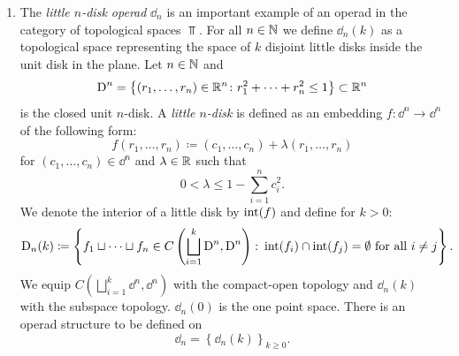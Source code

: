 \begin{egs}
\begin{enumerate}
            \item The {\em little $n$-disk operad} $\dd_n$ is an important
            example of an operad in the category of topological spaces $\Top$.
            For all $n \in \mathbb{N}$ we define $\dd_n(k)$ as a topological space
            representing the space of $k$ disjoint little disks inside the unit
            disk in the plane. Let $n \in \mathbb{N}$ and 
            \[
                \operatorname{D}^n = \left\{ (r_1, \dots, r_n) \in \mathbb{R}^n \colon r_1^2 + \dots + r_n^2 \leq 1\right\} \subset \mathbb{R}^n
            \]
            is the closed unit $n$-disk. A \emph{little $n$-disk} is defined as
            an embedding $f \colon \dd^n \to \dd^n$ of the following form:
            \[
             f(r_1, \dots, r_n) \coloneqq (c_1, \dots, c_n) 
            + \lambda(r_1, \dots, r_n)
            \]
            for $(c_1, \dots, c_n) \in \dd^n$ and $\lambda \in \mathbb{R}$ such that
            \[
                0 < \lambda \leq 1 - \sum_{i=1}^{n} c_i^2.     
            \]
            We denote the interior of a little disk by $\operatorname{int}(f)$ and define
            for $k > 0$:
            \[
                \operatorname{D}_n(k) \coloneqq \left\{ f_1 \sqcup \dots \sqcup f_n \in C\left(\bigsqcup_{i=1}^k \operatorname{D}^n, \operatorname{D}^n\right) \colon \operatorname{int}(f_i) \cap \operatorname{int}(f_j) = \emptyset \text{ for all } i \not= j\right\}.
            \]
            We equip $C\left(\bigsqcup_{i=1}^k \dd^n, \dd^n\right)$ with the
            compact-open topology and $\dd_n(k)$ with the subspace topology.
            $\dd_n(0)$ is the one point space.
            There is an operad structure to be defined on
            \[
                \dd_n = \left\{\dd_n(k)\right\}_{k \geq 0}.
            \]
                        

\end{enumerate}
\end{egs}
